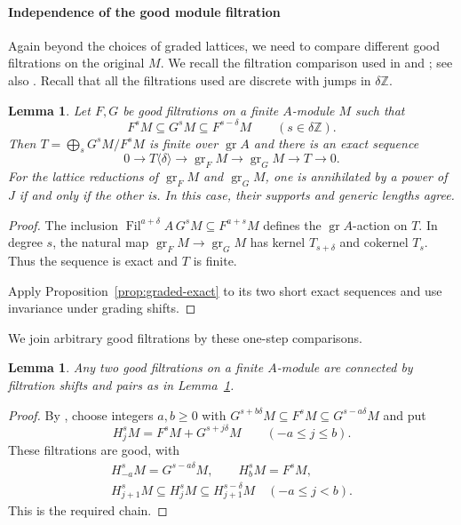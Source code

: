 \documentclass[11pt]{article}
\newtheorem{lemma}[theorem]{Lemma}
\theoremstyle{definition}
\newcommand{\gr}{\operatorname{gr}}
\newcommand{\Fil}{\operatorname{Fil}}
\begin{document}
\paragraph{Independence of the good module filtration}
\label{sec:filtrations}
Again beyond the choices of graded lattices, we need to compare different good filtrations on the original $M$. 
We recall the filtration comparison used in
\cite[\S3.3]{HuWangPadic} and \cite[proof of Lemma~3.81]{BHHMS2025};
see also \cite[Lemma~D.3.1]{HTT2008}. Recall that all the filtrations used are discrete with jumps
in $\delta\mathbb{Z}$.

\begin{lemma}\label{lem:filtration-step}
Let $F,G$ be good filtrations on a finite $A$-module $M$ such that
\[
 F^sM\subseteq G^sM\subseteq F^{s-\delta}M
 \qquad(s\in\delta\mathbb Z).
\]
Then $T=\bigoplus_sG^sM/F^sM$ is finite over $\gr A$ and there is an exact sequence
\[
 0\longrightarrow T\langle\delta\rangle
 \longrightarrow\gr_FM\longrightarrow\gr_GM
 \longrightarrow T\longrightarrow0.
\]
For the lattice reductions of $\gr_FM$ and $\gr_GM$, one is annihilated
by a power of $J$ if and only if the other is. In this case, their supports
and generic lengths agree.
\end{lemma}
\begin{proof}
The inclusion $\Fil^{a+\delta}A\,G^sM\subseteq F^{a+s}M$
defines the $\gr A$-action on $T$. In degree $s$, the natural map
$\gr_FM\to\gr_GM$ has kernel $T_{s+\delta}$ and cokernel $T_s$.
Thus the sequence is exact and $T$ is finite.

Apply Proposition~\ref{prop:graded-exact} to its two short exact
sequences and use invariance under grading shifts.
\end{proof}

We join arbitrary good filtrations by these one-step comparisons.

\begin{lemma}\label{lem:chain}
Any two good filtrations on a finite $A$-module are connected by
filtration shifts and pairs as in Lemma~\ref{lem:filtration-step}.
\end{lemma}
\begin{proof}
By \cite[Lemma~I.5.3]{LvO96}, choose integers $a,b\geq0$ with
$G^{s+b\delta}M\subseteq F^sM\subseteq G^{s-a\delta}M$ and put
\[
 H_j^sM=F^sM+G^{s+j\delta}M\qquad(-a\leq j\leq b).
\]
These filtrations are good, with
\[
 \begin{gathered}
 H_{-a}^sM=G^{s-a\delta}M,\qquad H_b^sM=F^sM,\\
 H_{j+1}^sM\subseteq H_j^sM\subseteq H_{j+1}^{s-\delta}M
 \quad(-a\leq j<b).
 \end{gathered}
\]
This is the required chain.
\end{proof}
\end{document}
